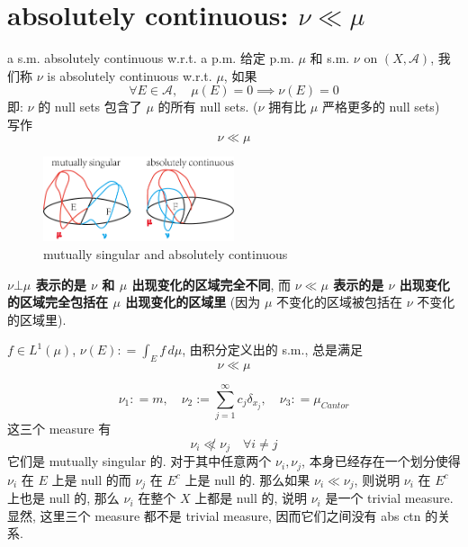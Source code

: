 \documentclass[lang=cn,11pt]{elegantbook}
\begin{document}
\section{ absolutely continuous: $\nu \ll \mu$}
\begin{definition}{a s.m. absolutely continuous w.r.t. a p.m.}
    给定 p.m. $\mu$ 和 s.m. $\nu$ on $(X,\mathcal{A})$, 我们称 $\nu$ is absolutely continuous w.r.t. $\mu$, 如果 \[
 \forall E\in \mathcal{A},\quad    \mu(E) = 0\implies \nu(E) = 0
    \]
    即: $\nu$ 的 null sets 包含了 $\mu$ 的所有 null sets. ($\nu$ 拥有比 $\mu$ 严格更多的 null sets)\\
    写作 \[
    \nu \ll \mu
    \]
\end{definition}
\begin{figure}[h]
    \centering
    \includegraphics[width=0.5\textwidth]{ch3-pics.assets/absctn.png}
    \caption{mutually singular and absolutely continuous}
    \label{mutually singular and absolutely continuous}
\end{figure}
\textbf{$\nu \bot  \mu$ 表示的是 $\nu$ 和 $\mu$ 出现变化的区域完全不同}, 而 \textbf{$\nu \ll \mu$ 表示的是 $\nu$ 出现变化的区域完全包括在 $\mu$ 出现变化的区域里 }(因为 $\mu$ 不变化的区域被包括在 $\nu$ 不变化的区域里).
 
\begin{example}
    $f \in L^1 (\mu)$, $\nu(E) : = \int_E f \, d\mu$, 由积分定义出的 s.m., 总是满足 \[
    \nu \ll \mu
    \]
\end{example}
\begin{example}\[
    \nu_1 : = m,\quad \nu_2 := \sum_{j=1}^\infty c_j \delta_{x_j},\quad \nu_3 : = \mu_{Cantor}
    \]
    这三个 measure 有 \[
    \nu_i \not \ll \nu_j \quad \forall i\not = j
    \]
    它们是 mutually singular 的. 对于其中任意两个 $\nu_i,\nu_j$, 本身已经存在一个划分使得 $\nu_i$ 在 $E$ 上是 null 的而 $\nu_j$ 在 $E^c$ 上是 null 的. 那么如果 $\nu_i \ll \nu_j$, 则说明 $\nu_i$ 在 $E^c$ 上也是 null 的, 那么 $\nu_i$ 在整个 $X$ 上都是 null 的, 说明 $\nu_i$ 是一个 trivial measure.\\
    显然, 这里三个 measure 都不是 trivial measure, 因而它们之间没有 abs ctn 的关系.
\end{example}
\end{document}
